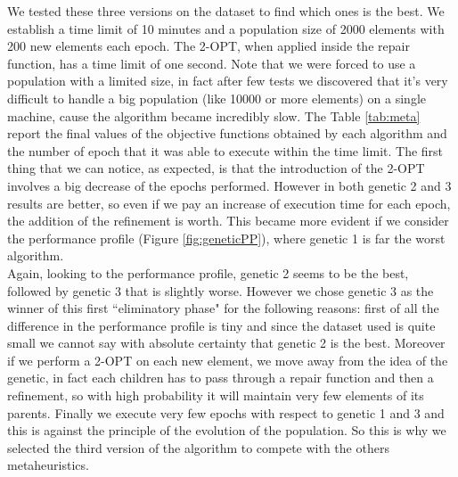 \noindent We tested these three versions on the dataset to find which ones is the best. We establish a time limit of 10 minutes and a population size of 2000 elements with 200 new elements each epoch. The 2-OPT, when applied inside the repair function, has a time limit of one second. Note that we were forced to use a population with a limited size, in fact after few tests we discovered that it's very difficult to handle a big population (like 10000 or more elements) on a single machine, cause the algorithm became incredibly slow.
The Table \ref{tab:meta} report the final values of the objective functions obtained by each algorithm and the number of epoch that it was able to execute within the time limit. The first thing that we can notice, as expected, is that the introduction of the 2-OPT involves a big decrease of the epochs performed. However in both genetic 2 and 3 results are better, so even if we pay an increase of execution time for each epoch, the addition of the refinement is worth. This became more evident if we consider the performance profile (Figure \ref{fig:geneticPP}), where genetic 1 is far the worst algorithm. \\ 
Again, looking to the performance profile, genetic 2 seems to be the best, followed by genetic 3 that is slightly worse. However we chose genetic 3 as the winner of this first ``eliminatory phase" for the following reasons: first of all the difference in the performance profile is tiny and since the dataset used is quite small we cannot say with absolute certainty that genetic 2 is the best. Moreover if we perform a 2-OPT on each new element, we move away from the idea of the genetic, in fact each children has to pass through a repair function and then a refinement, so with high probability it will maintain very few elements of its parents. Finally we execute very few epochs with respect to genetic 1 and 3 and this is against the principle of the evolution of the population. So this is why we selected the third version of the algorithm to compete with the others metaheuristics.\\

